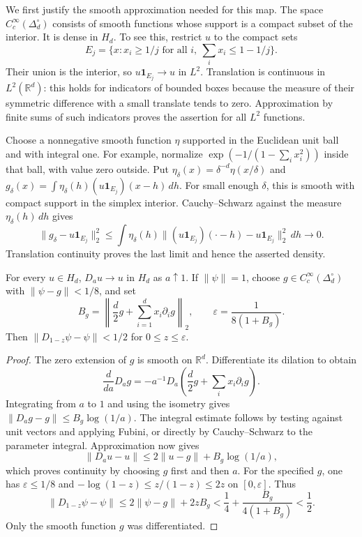 \documentclass[11pt]{article}
\begin{document}
We first justify the smooth approximation needed for this map.
The space $C_c^\infty(\Delta_d^\circ)$ consists of smooth functions whose
support is a compact subset of the interior.
It is dense in $H_d$.
To see this, restrict $u$ to the compact sets
\[
 E_j=\{x:x_i\geq1/j\text{ for all }i,\ \sum_i x_i\leq1-1/j\}.
\]
Their union is the interior, so $u\mathbf1_{E_j}\to u$ in $L^2$.
Translation is continuous in $L^2(\mathbb R^d)$: this holds for indicators
of bounded boxes because the measure of their symmetric difference with
a small translate tends to zero.
Approximation by finite sums of such indicators proves the assertion for
all $L^2$ functions.

Choose a nonnegative smooth function $\eta$ supported in the Euclidean
unit ball and with integral one.
For example, normalize $\exp(-1/(1-\sum_i x_i^2))$ inside that ball,
with value zero outside.
Put $\eta_\delta(x)=\delta^{-d}\eta(x/\delta)$ and
$g_\delta(x)=\int\eta_\delta(h)(u\mathbf1_{E_j})(x-h)\,dh$.
For small enough $\delta$, this is smooth with compact support in the
simplex interior.  Cauchy--Schwarz against the measure
$\eta_\delta(h)\,dh$ gives
\[
 \|g_\delta-u\mathbf1_{E_j}\|_2^2
 \leq\int\eta_\delta(h)
       \|(u\mathbf1_{E_j})(\cdot-h)-u\mathbf1_{E_j}\|_2^2\,dh\to0.
\]
Translation continuity proves the last limit and hence the asserted density.

\begin{lemma}\label{all:lem:dilation-continuity}
For every $u\in H_d$, $D_au\to u$ in $H_d$ as $a\uparrow1$.
If $\|\psi\|=1$, choose $g\in C_c^\infty(\Delta_d^\circ)$ with
$\|\psi-g\|<1/8$, and set
\begin{equation}\label{all:eq:epsilon}
 B_g=\left\|\frac d2g+\sum_{i=1}^d x_i\partial_i g\right\|_2,
 \qquad \varepsilon=\frac1{8(1+B_g)}.
\end{equation}
Then $\|D_{1-z}\psi-\psi\|<1/2$ for $0\leq z\leq\varepsilon$.
\end{lemma}

\begin{proof}
The zero extension of $g$ is smooth on $\mathbb R^d$.
Differentiate its dilation to obtain
\[
 \frac{d}{da}D_ag
 =-a^{-1}D_a\left(\frac d2g+\sum_i x_i\partial_i g\right).
\]
Integrating from $a$ to $1$ and using the isometry gives
$\|D_ag-g\|\leq B_g\log(1/a)$.
The integral estimate follows by testing against unit vectors and applying
Fubini, or directly by Cauchy--Schwarz to the parameter integral.
Approximation now gives
\[
 \|D_au-u\|\leq2\|u-g\|+B_g\log(1/a),
\]
which proves continuity by choosing $g$ first and then $a$.
For the specified $g$, one has $\varepsilon\leq1/8$ and
$-\log(1-z)\leq z/(1-z)\leq2z$ on $[0,\varepsilon]$.
Thus
\[
 \|D_{1-z}\psi-\psi\|
 \leq2\|\psi-g\|+2zB_g
 <\frac14+\frac{B_g}{4(1+B_g)}<\frac12.
\]
Only the smooth function $g$ was differentiated.
\end{proof}
\end{document}
